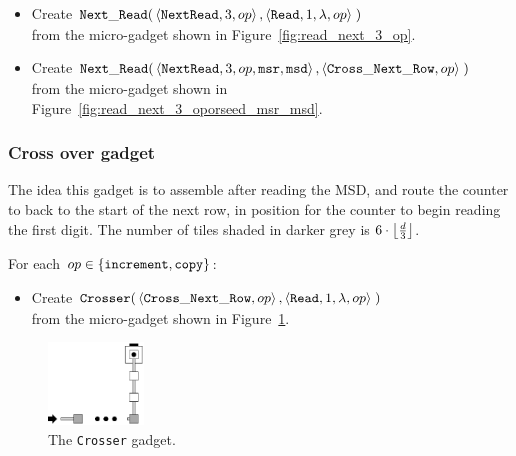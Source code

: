 \begin{itemize}
    \item Create
    $\begin{aligned}[t]
        \readnext(& \left\langle {\tt NextRead}, 3,          \inc \right\rangle,
                    \left\langle {\tt Read},     1, \lambda, \inc \right\rangle \;)
    \end{aligned}$\\from the micro-gadget shown in Figure~\ref{fig:read_next_3_op}.

    \item Create
    $\begin{aligned}[t]
        \readnext(& \left\langle {\tt NextRead}, 3,      \inc, {\tt msr}, {\tt msd} \right\rangle,
                    \left\langle {\tt Cross\_Next\_Row}, \inc \right\rangle \;)
    \end{aligned}$\\from the micro-gadget shown in Figure~\ref{fig:read_next_3_oporseed_msr_msd}.


\end{itemize}

\subsubsection{Cross over gadget}

The idea this gadget is to assemble after reading the MSD, and route the
counter to back to the start of the next row, in position for the counter to
begin reading the first digit. The number of tiles shaded in darker grey is
$6 \cdot \floor*{\frac{d}{3}}$.

\vspace{.5cm}
For each $\inc\in \{ {\tt increment}, {\tt copy} \}$:

\begin{itemize}
    \item Create
    $\begin{aligned}[t]
        {\tt Crosser}(&\left\langle {\tt Cross\_Next\_Row}, \inc \right\rangle,
                       \left\langle {\tt Read}, 1, \lambda, \inc \right\rangle \;)
    \end{aligned}$\\from the micro-gadget shown in Figure~\ref{fig:cross_to_next_row}.
\end{itemize}

\begin{figure}[H]
    \centering
    \includegraphics[width=1in]{cross_to_next_row}
    \caption{\label{fig:cross_to_next_row} The {\tt Crosser} gadget.}
\end{figure}